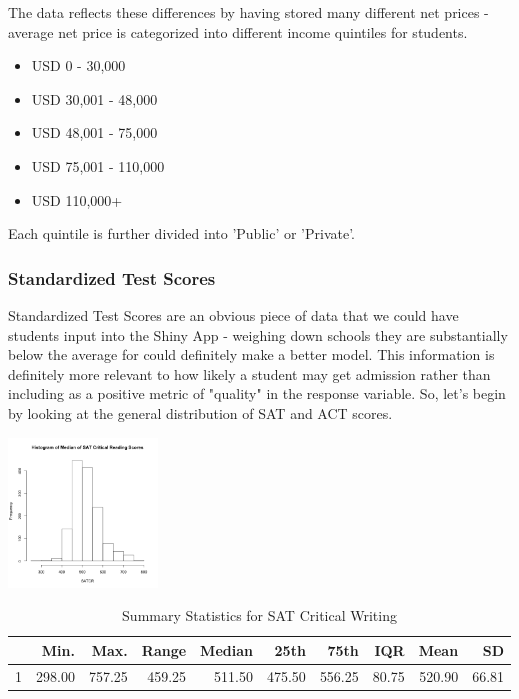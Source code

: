 \documentclass{article}\usepackage[]{graphicx}\usepackage[]{color}
\begin{document}
The data reflects these differences by having stored many different net prices - average net price is categorized into different income quintiles for students. 

\begin{itemize}
\item USD 0 - 30,000
\item USD 30,001 - 48,000
\item USD 48,001 - 75,000
\item USD 75,001 - 110,000
\item USD 110,000+
\end{itemize}

Each quintile is further divided into 'Public' or 'Private'. 

\subsubsection{Standardized Test Scores}

Standardized Test Scores are an obvious piece of data that we could have students input into the Shiny App - weighing down schools they are substantially below the average for could definitely make a better model. This information is definitely more relevant to how likely a student may get admission rather than including as a positive metric of "quality" in the response variable. So, let's begin by looking at the general distribution of SAT and ACT scores.



{\centering \includegraphics[width=150px]{../images/histogram-SATCRMedian} 

}


\begin{table}[ht]
\centering
\begin{tabular}{rrrrrrrrrr}
  \hline
 & Min. & Max. & Range & Median & 25th & 75th & IQR & Mean & SD \\ 
  \hline
1 & 298.00 & 757.25 & 459.25 & 511.50 & 475.50 & 556.25 & 80.75 & 520.90 & 66.81 \\ 
   \hline
\end{tabular}
\caption{Summary Statistics for SAT Critical Writing} 
\end{table}
\end{document}
